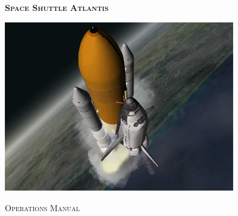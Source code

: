 


\graphicspath{{Images//}}



\renewcommand*\familydefault{\sfdefault}
\sffamily

\pagestyle{fancy}
\renewcommand{\footrulewidth}{0.4pt}


\lhead{}
\chead{}
\rhead{}
\cfoot{\thepage}

\titleformat{\paragraph}[hang]{\bfseries}{\theparagraph}{1em}{}


\begin{titlepage}
\begin{center}

\vspace*{3.0cm}
\textsc{\fontsize{40}{40} \textbf{Space Shuttle Atlantis}}\\
\vspace{3.0cm}

\includegraphics[width=0.75\textwidth]{Images//Pic1.png}
\vspace{2.0cm}

\textsc{\Huge Operations Manual}


\end{center}
\end{titlepage}


\newpage
{}

\tableofcontents
\newpage


\newcommand{\ks}{\keystroke}
\setlength{\parindent}{0pt}


